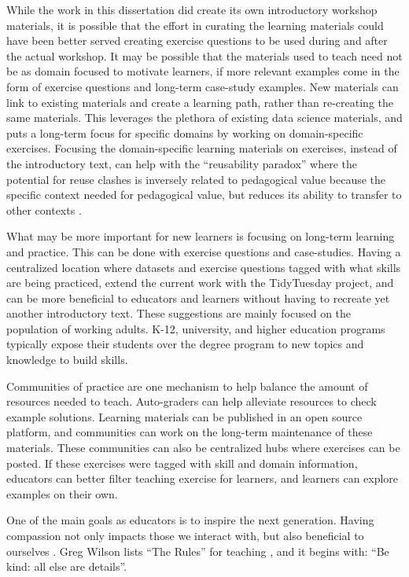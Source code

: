 \documentclass[../main.tex]{subfiles}
\begin{document}
While the work in this dissertation did create its own introductory workshop materials,
it is possible that the effort in curating the learning materials could have been better served creating exercise questions
to be used during and after the actual workshop.
It may be possible that the materials used to teach need not be as domain focused
to motivate learners, if more relevant examples come in the form of exercise questions and long-term case-study examples.
New materials can link to existing materials and create a learning path,
rather than re-creating the same materials.
This leverages the plethora of existing data science materials,
and puts a long-term focus for specific domains by working on domain-specific exercises.
Focusing the domain-specific learning materials on exercises, instead of the introductory text,
can help with the ``reusability paradox'' where the potential for reuse clashes is inversely related to pedagogical value
because the specific context needed for pedagogical value, but reduces its ability to transfer to other contexts
\cite{wileyReusabilityParadox2002}.

What may be more important for new learners is focusing on long-term learning and practice.
This can be done with exercise questions and case-studies.
Having a centralized location where datasets and exercise questions tagged with what skills are being practiced,
extend the current work with the TidyTuesday project,
and can be more beneficial to educators and learners without having to recreate yet another
introductory text.
These suggestions are mainly focused on the population of working adults.
K-12, university, and higher education programs typically expose their students
over the degree program to new topics and knowledge to build skills.

Communities of practice are one mechanism to help balance the amount of resources needed to teach.
Auto-graders can help alleviate resources to check example solutions.
Learning materials can be published in an open source platform,
and communities can work on the long-term maintenance of these materials.
These communities can also be centralized hubs where exercises can be posted.
If these exercises were tagged with skill and domain information,
educators can better filter teaching exercise for learners,
and learners can explore examples on their own.

One of the main goals as educators is to inspire the next generation.
Having compassion not only impacts those we interact with, but also beneficial to ourselves
\cite{trzeciakCompassionomics2019}.
Greg Wilson lists ``The Rules'' for teaching \cite{wilson2019teaching}, and it begins with: ``Be kind: all else are details''.
\end{document}
